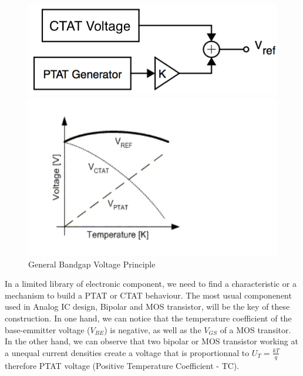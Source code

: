 \documentclass[11pt,a4paper]{report}
\begin{document}
\begin{figure}[h!]
   \begin{minipage}[b]{0.5\linewidth}
      \centering \includegraphics[scale=0.35]{photo/schema_principe}
   \end{minipage}\hfill
   \begin{minipage}[b]{0.5\linewidth}
      \centering \includegraphics[scale=0.4]{photo/sum_crb}
   \end{minipage}
   \caption{General Bandgap Voltage Principle}
   \label{Gene_bandgap}
\end{figure}

In a limited library of electronic component, we need to find a characteristic or a mechanism to build a PTAT or CTAT behaviour. The most usual componenent used in Analog IC design, Bipolar and MOS transistor, will be the key of these construction. In one hand, we can notice that the temperature coefficient of the base-emmitter voltage ($V_{BE}$) is negative, as well as the $V_{GS}$ of a MOS transitor. In the other hand, we can observe that two bipolar or MOS transistor working at a unequal current densities create a voltage that is proportionnal to $U_T = \frac{kT}{q}$ therefore PTAT voltage (Positive Temperature Coefficient - TC).
\end{document}
